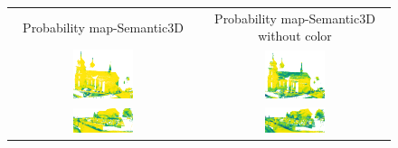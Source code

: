     \begin{figure}[h!]
        \centering
        \begin{tabular}{cc}
            Probability map-Semantic3D & Probability map-Semantic3D without color \\
            \includegraphics[width=0.33\textwidth, height=0.18\textheight]{images/ood_imgs/fout_sem3d/fout_prob_1.pdf}&
            \includegraphics[width=0.33\textwidth, height=0.18\textheight]{images/sem3d_of/fout_prob_sem3d_of_1.pdf}\\

            \includegraphics[width=0.33\textwidth, height=0.18\textheight]{images/ood_imgs/fout_sem3d/fout_prob_2.pdf}&
            \includegraphics[width=0.33\textwidth, height=0.18\textheight]{images/sem3d_of/fout_prob_sem3d_of_2.pdf}\\


\end{tabular}
\end{figure}
